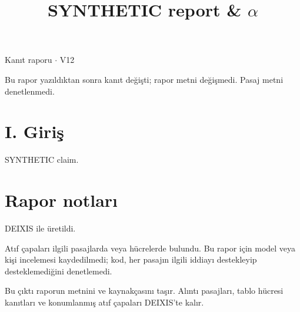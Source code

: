 \documentclass[journal]{IEEEtran}
\begin{document}
\renewcommand{\abstractname}{Özet}
\renewcommand{\IEEEkeywordsname}{Dizin Terimleri}
\renewcommand{\refname}{Kaynaklar}

\title{SYNTHETIC report \& \ensuremath{\alpha}}

\maketitle

\noindent Kanıt raporu \ensuremath{\cdot} V12

\noindent Bu rapor yazıldıktan sonra kanıt değişti; rapor metni değişmedi. Pasaj metni denetlenmedi.

\section*{I. Giriş}

SYNTHETIC claim. \cite{Synth26}

\section*{Rapor notları}

DEIXIS ile üretildi.

Atıf çapaları ilgili pasajlarda veya hücrelerde bulundu. Bu rapor için model veya kişi incelemesi kaydedilmedi; kod, her pasajın ilgili iddiayı destekleyip desteklemediğini denetlemedi.

Bu çıktı raporun metnini ve kaynakçasını taşır. Alıntı pasajları, tablo hücresi kanıtları ve konumlanmış atıf çapaları DEIXIS'te kalır.




\end{document}

